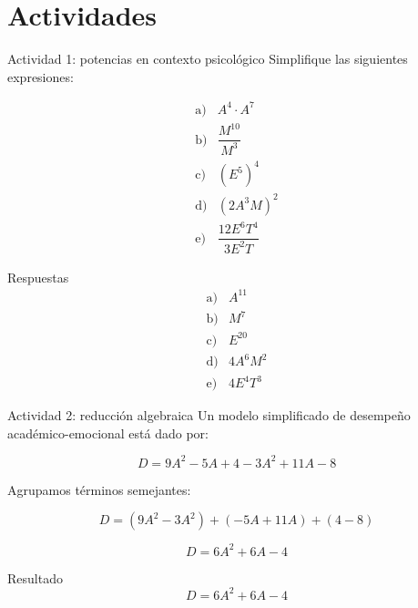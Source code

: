 \documentclass[aspectratio=169]{beamer}
\begin{document}
	\section{Actividades}
	
	\begin{frame}{Actividad 1: potencias en contexto psicológico}
		Simplifique las siguientes expresiones:
		
		\[
		\begin{array}{ll}
			\text{a)} & A^4\cdot A^7 \\[0.2cm]
			\text{b)} & \dfrac{M^{10}}{M^3} \\[0.3cm]
			\text{c)} & (E^5)^4 \\[0.2cm]
			\text{d)} & (2A^3M)^2 \\[0.2cm]
			\text{e)} & \dfrac{12E^6T^4}{3E^2T}
		\end{array}
		\]
		
		\pause
		
		\begin{block}{Respuestas}
			\[
			\begin{array}{ll}
				\text{a)} & A^{11} \\[0.2cm]
				\text{b)} & M^7 \\[0.2cm]
				\text{c)} & E^{20} \\[0.2cm]
				\text{d)} & 4A^6M^2 \\[0.2cm]
				\text{e)} & 4E^4T^3
			\end{array}
			\]
		\end{block}
	\end{frame}
	
	
	\begin{frame}{Actividad 2: reducción algebraica}
		Un modelo simplificado de desempeño académico-emocional está dado por:
		
		\[
		D=9A^2-5A+4-3A^2+11A-8
		\]
		
		\pause
		
		Agrupamos términos semejantes:
		
		\[
		D=(9A^2-3A^2)+(-5A+11A)+(4-8)
		\]
		
		\pause
		
		\[
		D=6A^2+6A-4
		\]
		
		\pause
		
		\begin{block}{Resultado}
			\[
			D=6A^2+6A-4
			\]
		\end{block}
	\end{frame}
	
\end{document}
